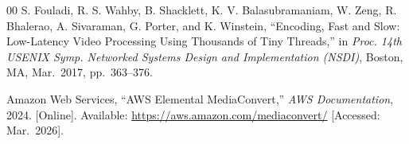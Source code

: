 \documentclass[conference]{IEEEtran}
\begin{document}
\begin{thebibliography}{00}
 S. Fouladi, R. S. Wahby, B. Shacklett, K. V. Balasubramaniam,
W. Zeng, R. Bhalerao, A. Sivaraman, G. Porter, and K. Winstein,
``Encoding, Fast and Slow: Low-Latency Video Processing Using Thousands
of Tiny Threads,'' in \emph{Proc. 14th USENIX Symp. Networked Systems
Design and Implementation (NSDI)}, Boston, MA, Mar.\ 2017, pp.\ 363--376.

 Amazon Web Services, ``AWS Elemental MediaConvert,''
\emph{AWS Documentation}, 2024. [Online]. Available:
\url{https://aws.amazon.com/mediaconvert/}
[Accessed: Mar.\ 2026].

\end{thebibliography}
\end{document}
